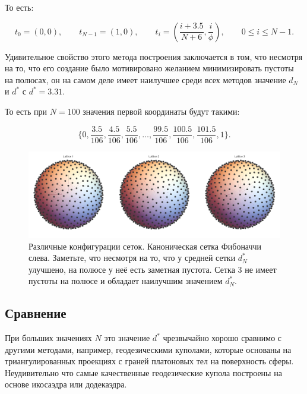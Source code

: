 \documentclass[12pt, a4paper]{article}
\begin{document}
То есть:

\begin{displaymath}
    t_0 = (0, 0),
    \qquad
    t_{N-1} = (1, 0),
    \qquad
    t_i = \left( \frac{i + 3.5}{N + 6}, \frac{i}{\phi} \right),
    \qquad
    0 \leq i \leq N-1.
    \tag{3}
\end{displaymath}

Удивительное свойство этого метода построения заключается в том, что несмотря на то, что его создание было мотивировано желанием минимизировать пустоты на полюсах, он на самом деле имеет наилучшее среди всех методов значение $d_N$ и $d^*$ с $d^* = 3.31$.

То есть при $N=100$ значения первой координаты будут такими:

\begin{displaymath}
    \{
        0,
        \frac{3.5}{106},
        \frac{4.5}{106},
        \frac{5.5}{106},
        \ldots,
        \frac{99.5}{106},
        \frac{100.5}{106},
        \frac{101.5}{106},
        1
    \}.
\end{displaymath}

\begin{figure}[H]
    \centering
    \includegraphics[width=\textwidth]{images/3.png}
    \caption{Различные конфигурации сеток. Каноническая сетка Фибоначчи слева. Заметьте, что несмотря на то, что у средней сетки $d_N^*$ улучшено, на полюсе у неё есть заметная пустота. Сетка 3 не имеет пустоты на полюсе и обладает наилучшим значением $d_N^*$.}
\end{figure}

\subsection{Сравнение}

При больших значениях $N$ это значение $d^*$ чрезвычайно хорошо сравнимо с другими методами, например, геодезическими куполами, которые основаны на триангулированных проекциях с граней платоновых тел на поверхность сферы. Неудивительно что самые качественные геодезические купола построены на основе икосаэдра или додекаэдра.
\end{document}
